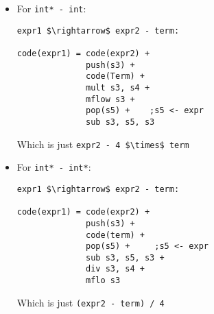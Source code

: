 \documentclass[12pt]{article}
\begin{document}
\begin{itemize}
\begin{itemize}
\begin{lstlisting}[mathescape, numbers=none, breaklines=true]
code(expr1) = code(expr2) + 
              mult s3, s4 +
              mflow s3 +
              push(s3) +
              code(term) + 
              pop(s5) +    ;s5 <- expr
              add s3, s5, s3
\end{lstlisting}
            Which corresponds to \lstinline[mathescape]{4 $\times$ expr2 + term}
            \item For \lstinline[mathescape]{int* - int}:
\begin{lstlisting}[mathescape, numbers=none, breaklines=true]
expr1 $\rightarrow$ expr2 - term:

code(expr1) = code(expr2) +
              push(s3) +
              code(Term) +
              mult s3, s4 +
              mflow s3 +
              pop(s5) +    ;s5 <- expr
              sub s3, s5, s3
\end{lstlisting}
            Which is just \lstinline[mathescape]{expr2 - 4 $\times$ term}
            \item For \lstinline[mathescape]{int* - int*}:
\begin{lstlisting}[mathescape, numbers=none, breaklines=true]
expr1 $\rightarrow$ expr2 - term:

code(expr1) = code(expr2) + 
              push(s3) +
              code(term) +
              pop(s5) +     ;s5 <- expr
              sub s3, s5, s3 +
              div s3, s4 +
              mflo s3
\end{lstlisting}
            Which is just \lstinline[mathescape]{(expr2 - term) / 4}
        \end{itemize}
        

\end{itemize}
\end{document}
